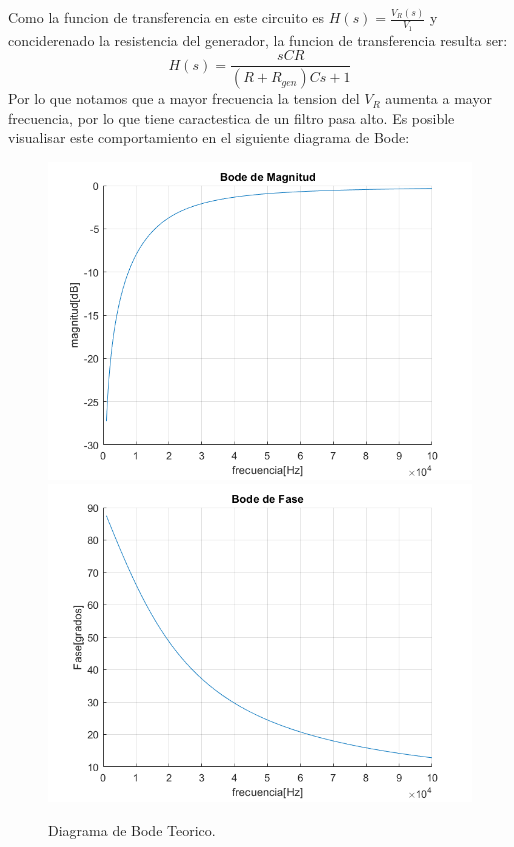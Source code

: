 Como la funcion de transferencia en este circuito es $H(s) = \frac{V_R(s)}{V_1}$ y conciderenado la resistencia del generador, la funcion de transferencia resulta ser:
$$H(s) = \frac{sCR}{\left(R+R_{gen}\right)Cs+1}$$
Por lo que notamos que a mayor frecuencia la tension del $V_R$ aumenta a mayor frecuencia, por lo que tiene caractestica de un filtro pasa alto. Es posible visualisar este comportamiento en el siguiente diagrama de Bode:

\begin{figure}[h!]
\centering
\includegraphics[scale=0.5]{2teomag.png}
\includegraphics[scale=0.5]{2teofase.png}
\caption{Diagrama de Bode Teorico.}
\label{fig:CR}
\end{figure}


